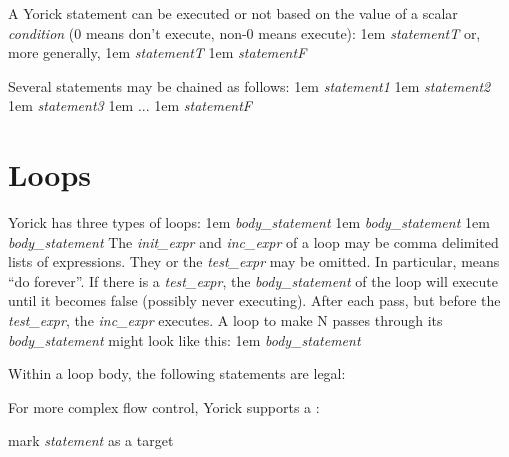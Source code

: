 A Yorick statement can be executed or not based on the value of a
scalar {\it condition} (0 means don't execute, non-0 means execute):
\begindemo
\hglue1em \kbd{)} {\it statementT}
\enddemo
or, more generally,
\begindemo
\hglue1em \kbd{)} {\it statementT}
\hglue1em  {\it statementF}
\enddemo

Several  statements may be chained as follows:
\begindemo
\hglue1em \kbd{)} {\it statement1}
\hglue1em \kbd{)} {\it statement2}
\hglue1em \kbd{)} {\it statement3}
\hglue1em ...
\hglue1em  {\it statementF}
\enddemo

\section{Loops}

Yorick has three types of loops:
\begindemo
\hglue1em\kbd{)} {\it body\_statement}
\hglue1em {\it body\_statement\/} \kbd{)}
\hglue1em\kbd{)} {\it body\_statement}
\enddemo
The {\it init\_expr} and {\it inc\_expr} of a  loop may be comma
delimited lists of expressions.  They or the {\it test\_expr} may be
omitted.  In particular,  means ``do forever''.  If
there is a {\it test\_expr}, the {\it body\_statement} of the  loop
will execute until it becomes false (possibly never executing).  After
each pass, but before the {\it test\_expr}, the {\it inc\_expr} executes.
A  loop to make N passes through its {\it body\_statement} might
look like this: \hfil\break
\hglue1em {\it body\_statement}


Within a loop body, the following statements are legal:


For more complex flow control, Yorick supports a :

       {mark {\it statement} as a  target}

\copyrightnotice

\par\vfill\supereject

